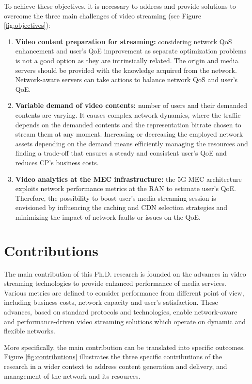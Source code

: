 To achieve these objectives, it is necessary to address and provide solutions to overcome the three main challenges of video streaming (see Figure \ref{fig:objectives}):

\begin{enumerate}
	\item \textbf{Video content preparation for streaming:}
	considering network QoS enhancement and user's QoE improvement as separate optimization problems is not a good option as they are intrinsically related.
	The origin and media servers should be provided with the knowledge acquired from the network. Network-aware servers can take actions to balance network QoS and user's QoE.	
	\item \textbf{Variable demand of video contents:} number of users and their demanded contents are varying. It causes complex network dynamics, where the traffic depends on the demanded contents and the representation bitrate chosen to stream them at any moment. Increasing or decreasing the employed network assets depending on the demand means efficiently managing the resources and finding a trade-off that ensures a steady and consistent user's QoE and reduces CP's business costs.
	\item \textbf{Video analytics at the MEC infrastructure:} the 5G MEC architecture exploits network performance metrics at the RAN to estimate user's QoE. Therefore, the possibility to boost user's media streaming session is envisioned by influencing the caching and CDN selection strategies and minimizing the impact of network faults or issues on the QoE.
\end{enumerate}

\section{Contributions}

The main contribution of this Ph.D. research is founded on the advances in video streaming technologies to provide enhanced performance of media services. Various metrics are defined to consider performance from different point of view, including business costs, network capacity and user's satisfaction. These advances, based on standard protocols and technologies, enable network-aware and performance-driven video streaming solutions which operate on dynamic and flexible networks.

More specifically, the main contribution can be translated into specific outcomes. Figure \ref{fig:contributions} illustrates the three specific contributions of the research in a wider context to address content generation and delivery, and management of the network and its resources.

